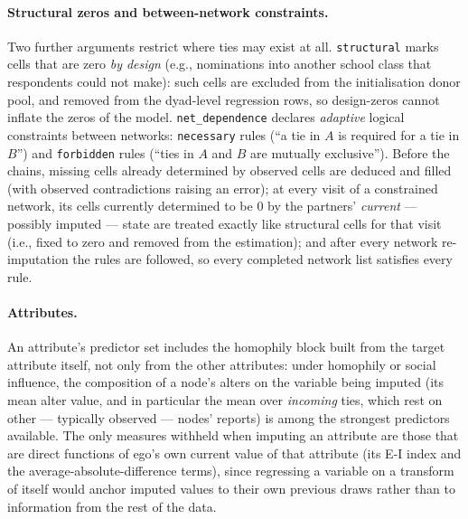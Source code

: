 \documentclass[11pt,a4paper]{article}
\newcommand{\code}[1]{\texttt{#1}}
\begin{document}
\paragraph{Structural zeros and between-network constraints.} Two further
arguments restrict where ties may exist at all. \code{structural} marks
cells that are zero \emph{by design} (e.g., nominations into another school
class that respondents could not make): such cells are excluded from the initialisation donor pool,
and removed from the dyad-level regression rows, so design-zeros cannot
inflate the zeros of the model. \code{net\_dependence} declares
\emph{adaptive} logical constraints between networks: \code{necessary}
rules (``a tie in $A$ is required for a tie in $B$'') and \code{forbidden}
rules (``ties in $A$ and $B$ are mutually exclusive''). Before the chains,
missing cells already determined by observed cells are deduced and filled
(with observed contradictions raising an error); at every visit of a
constrained network, its cells currently determined to be $0$ by the
partners' \emph{current} --- possibly imputed --- state are treated exactly
like structural cells for that visit (i.e., fixed to zero and removed from the estimation); and after every network
re-imputation the rules are followed, so every completed
network list satisfies every rule.

\paragraph{Attributes.} An attribute's predictor set includes the homophily block built from the
target attribute itself, not only from the other attributes: under
homophily or social influence, the composition of a node's alters on the
 variable being imputed (its mean alter value, and in particular the
mean over \emph{incoming} ties, which rest on other --- typically observed
--- nodes' reports) is among the strongest predictors available. The only
measures withheld when imputing an attribute are those that are direct
functions of ego's own current value of that attribute (its E-I index and
the average-absolute-difference terms), since regressing a variable on
a transform of itself would anchor imputed values to their own previous
draws rather than to information from the rest of the data.
\end{document}
